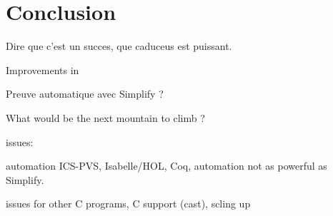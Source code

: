 \section{Conclusion}
\label{sec:conclusion}

Dire que c'est un succes, que caduceus est puissant.

Improvements in \caduceus{} 

Preuve automatique avec Simplify ?

What would be the next mountain to climb ?

issues:

 automation  ICS-PVS, Isabelle/HOL, Coq, automation not as powerful as
 Simplify. 

 issues for other C programs, C support (cast), scling up

